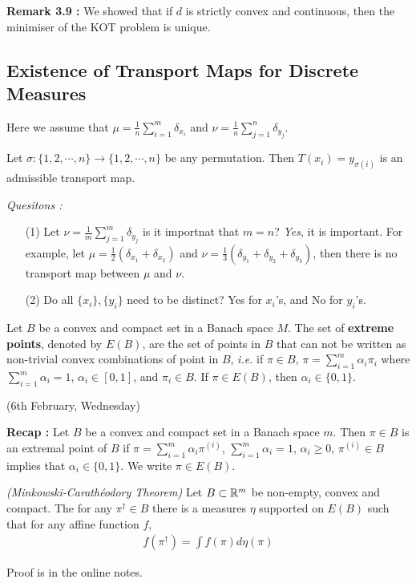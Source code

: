 \documentclass[12pt,a4paper]{article}
\newenvironment{proof}
{\begin{changemargin}{1cm}{0.5cm} 
	}%
	{\end{changemargin}
}
\newenvironment{p}
{\begin{proof} 
	}%
	{\end{proof}
}
\begin{document}
\textbf{Remark 3.9 :} We showed that if $d$ is strictly convex and continuous, then the minimiser of the KOT problem is unique.

\subsection{Existence of Transport Maps for Discrete Measures}

Here we assume that $\mu = \frac{1}{n} \sum_{i=1}^m \delta_{x_i}$ and $\nu = \frac{1}{n} \sum_{j=1}^n \delta_{y_j}$.
\s

Let $\sigma : \{1, 2, \cdots ,n \} \rightarrow \{1, 2, \cdots ,n \}$ be any permutation. Then $T(x_i) = y_{\sigma(i)}$ is an admissible transport map.
\s

\emph{Quesitons :}
\begin{itemize}
\item[(1)] Let $\nu =\frac{1}{m}\sum_{j=1}^m \delta_{y_j}$ is it importnat that $m=n$? \textit{Yes}, it is important. For example, let $\mu = \frac{1}{2}(\delta_{x_1} + \delta_{x_2})$ and $\nu = \frac{1}{3} (\delta_{y_1} + \delta_{y_2} + \delta_{y_3})$, then there is no transport map between $\mu$ and $\nu$. 
\item[(2)] Do all $\{x_i\},\{y_i\}$ need to be distinct? Yes for $x_i$'s, and No for $y_i$'s.
\end{itemize}
\s

 Let $B$ be a convex and compact set in a Banach space $M$. The set of \textbf{extreme points}, denoted by $E(B)$, are the set of points in $B$ that can not be written as non-trivial convex combinations of point in $B$, \textit{i.e.} if $\pi \in B$, $\pi = \sum_{i=1}^m \alpha_i \pi_i$ where $\sum_{i=1}^m \alpha_i =1$, $\alpha_i \in [0,1]$, and $\pi_i \in B$. If $\pi \in E(B)$, then $\alpha_i \in \{0,1\}$.
\s

\newday

(6th February, Wednesday)
\s

\textbf{Recap :} Let $B$ be a convex and compact set in a Banach space $m$. Then $\pi \in B$ is an extremal point of $B$ if $\pi = \sum_{i=1}^m \alpha_i \pi^{(i)}$, $\sum_{i=1}^m \alpha_i =1$, $\alpha_i \geq 0 $, $\pi^{(i)}\in B$ implies that $\alpha_i \in \{0, 1\}$. We write $\pi \in E(B)$.
\s

 \emph{(Minkowski-Carath\'{e}odory Theorem)} Let $B\subset \mathbb{R}^m$ be non-empty, convex and compact. The for any $\pi^{\dagger} \in B$ there is a measures $\eta$ supported on $E(B)$ such that for any affine function $f$,
\begin{align*}
f(\pi^{\dagger}) = \int f(\pi) d\eta(\pi)
\end{align*}
\begin{p}
\pf Proof is in the online notes.
\end{p}
\s
\end{document}
